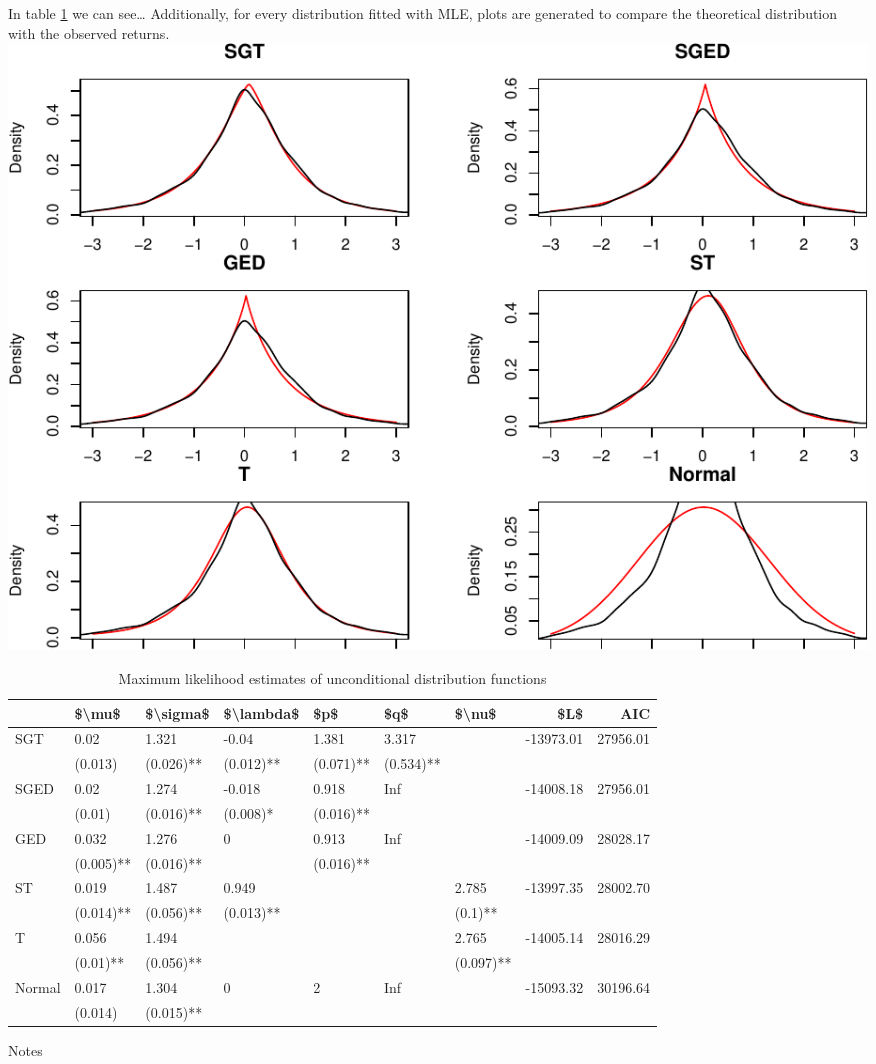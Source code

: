 \documentclass[a4paper, twoside]{templates/ociamthesis}
\begin{document}
In table \ref{tab:MLEtable} we can see\ldots{} Additionally, for every distribution fitted with MLE, plots are generated to compare the theoretical distribution with the observed returns.
\includegraphics{_main_files/figure-latex/MLE tables for diferent series-1.pdf}

\begin{table}[h!]

\caption{\label{tab:MLEtable}Maximum likelihood estimates of unconditional distribution functions}
\centering
\begin{threeparttable}
\begin{tabular}[t]{lllllllrr}
\toprule
 & \$\textbackslash{}mu\$ & \$\textbackslash{}sigma\$ & \$\textbackslash{}lambda\$ & \$p\$ & \$q\$ & \$\textbackslash{}nu\$ & \$L\$ & AIC\\
\midrule
SGT & 0.02 & 1.321 & -0.04 & 1.381 & 3.317 &  & -13973.01 & 27956.01\\
 & (0.013) & (0.026)** & (0.012)** & (0.071)** & (0.534)** &  &  & \\
SGED & 0.02 & 1.274 & -0.018 & 0.918 & Inf &  & -14008.18 & 27956.01\\
 & (0.01) & (0.016)** & (0.008)* & (0.016)** &  &  &  & \\
GED & 0.032 & 1.276 & 0 & 0.913 & Inf &  & -14009.09 & 28028.17\\
\addlinespace
 & (0.005)** & (0.016)** &  & (0.016)** &  &  &  & \\
ST & 0.019 & 1.487 & 0.949 &  &  & 2.785 & -13997.35 & 28002.70\\
 & (0.014)** & (0.056)** & (0.013)** &  &  & (0.1)** &  & \\
T & 0.056 & 1.494 &  &  &  & 2.765 & -14005.14 & 28016.29\\
 & (0.01)** & (0.056)** &  &  &  & (0.097)** &  & \\
\addlinespace
Normal & 0.017 & 1.304 & 0 & 2 & Inf &  & -15093.32 & 30196.64\\
 & (0.014) & (0.015)** &  &  &  &  &  & \\
\bottomrule
\end{tabular}
\begin{tablenotes}
\item Notes
\end{tablenotes}
\end{threeparttable}
\end{table}
\end{document}
